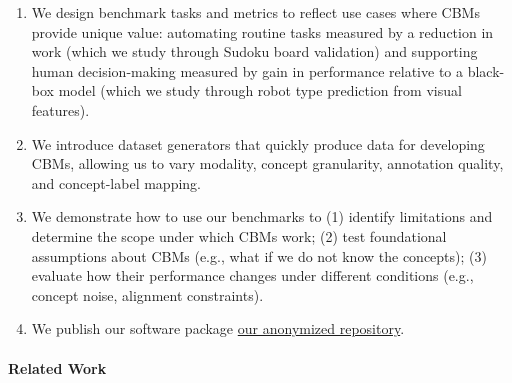 \documentclass[11pt]{article}
\newcommand{\repourl}[0]{\href{https://anonymous.4open.science/r/concept-benchmark-84D2}{our anonymized repository}}
\newcommand{\repourl}[0]{\href{https://github.com/ustunb/concept-benchmark}{on GitHub}}
\begin{document}
 \begin{enumerate}
    
     \item We design benchmark tasks and metrics to reflect use cases where CBMs provide unique value: automating routine tasks measured by a reduction in work (which we study through Sudoku board validation) and supporting human decision-making measured by gain in performance relative to a black-box model (which we study through robot type prediction from visual features).

     \item We introduce dataset generators that quickly produce data for developing CBMs, allowing us to vary modality, concept granularity, annotation quality, and concept-label mapping.

     \item We demonstrate how to use our benchmarks to (1) identify limitations and determine the scope under which CBMs work; (2) test foundational assumptions about CBMs (e.g., what if we do not know the concepts); (3) evaluate how their performance changes under different conditions (e.g., concept noise, alignment constraints).


     \item We publish our software package \repourl{}.
 \end{enumerate}


\paragraph{Related Work}
\end{document}
